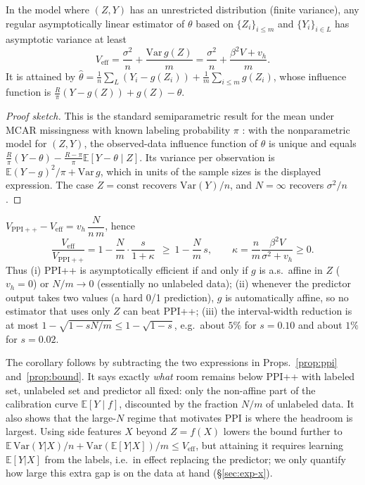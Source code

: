 \begin{proposition}\label{prop:bound}
In the model where $(Z,Y)$ has an unrestricted distribution (finite variance), any regular asymptotically linear estimator of $\theta$ based on $\{Z_i\}_{i\le m}$ and $\{Y_i\}_{i\in L}$ has asymptotic variance at least
\[V_{\mathrm{eff}}=\frac{\sigma^2}{n}+\frac{\mathrm{Var}\,g(Z)}{m}=\frac{\sigma^2}{n}+\frac{\beta^2V+v_h}{m}.\]
It is attained by $\hat\theta=\frac1n\sum_{L}(Y_i-g(Z_i))+\frac1m\sum_{i\le m}g(Z_i)$, whose influence function is $\frac{R}{\pi}(Y-g(Z))+g(Z)-\theta$.
\end{proposition}
\begin{proof}[Proof sketch]
This is the standard semiparametric result for the mean under MCAR missingness with known labeling probability $\pi$ \citep{robins1994estimation,bickel1993efficient,tsiatis2006semiparametric}: with the nonparametric model for $(Z,Y)$, the observed-data influence function of $\theta$ is unique and equals $\frac{R}{\pi}(Y-\theta)-\frac{R-\pi}{\pi}\mathbb E[Y-\theta\mid Z]$. Its variance per observation is $\mathbb E(Y-g)^2/\pi+\mathrm{Var}\,g$, which in units of the sample sizes is the displayed expression. The case $Z=\text{const}$ recovers $\mathrm{Var}(Y)/n$, and $N=\infty$ recovers $\sigma^2/n$ \citep{zhang2019semi}.
\end{proof}

\begin{corollary}\label{cor:gap}
$V_{\mathrm{PPI++}}-V_{\mathrm{eff}}=v_h\,\dfrac{N}{n\,m}$, hence
\[
\frac{V_{\mathrm{eff}}}{V_{\mathrm{PPI++}}}=1-\frac{N}{m}\cdot\frac{s}{1+\kappa}\ \ \ge\ 1-\frac{N}{m}\,s,\qquad \kappa=\frac{n}{m}\frac{\beta^2V}{\sigma^2+v_h}\ge 0 .
\]
Thus (i) PPI++ is asymptotically efficient if and only if $g$ is a.s.\ affine in $Z$ ($v_h=0$) or $N/m\to0$ (essentially no unlabeled data); (ii) whenever the predictor output takes two values (a hard 0/1 prediction), $g$ is automatically affine, so no estimator that uses only $Z$ can beat PPI++; (iii) the interval-width reduction is at most $1-\sqrt{1-sN/m}\le 1-\sqrt{1-s}$, e.g.\ about $5\%$ for $s=0.10$ and about $1\%$ for $s=0.02$.
\end{corollary}
The corollary follows by subtracting the two expressions in Props.~\ref{prop:ppi} and~\ref{prop:bound}. It says exactly \emph{what} room remains below PPI++ with labeled set, unlabeled set and predictor all fixed: only the non-affine part of the calibration curve $\mathbb E[Y\mid f]$, discounted by the fraction $N/m$ of unlabeled data. It also shows that the large-$N$ regime that motivates PPI is where the headroom is largest. Using side features $X$ beyond $Z=f(X)$ lowers the bound further to $\mathbb E\,\mathrm{Var}(Y|X)/n+\mathrm{Var}(\mathbb E[Y|X])/m\le V_{\mathrm{eff}}$, but attaining it requires learning $\mathbb E[Y|X]$ from the labels, i.e.\ in effect replacing the predictor; we only quantify how large this extra gap is on the data at hand (\S\ref{sec:exp-x}).

